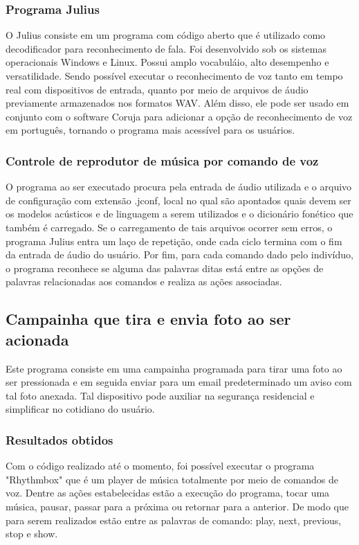 \subsubsection{Programa Julius}

O Julius consiste em um programa com código aberto que é utilizado como decodificador para reconhecimento de fala. 
Foi desenvolvido sob os sistemas operacionais Windows e Linux. Possui amplo vocabuláio, alto desempenho e versatilidade. 
Sendo possível executar o reconhecimento de voz tanto em tempo real com dispositivos de entrada, quanto por meio de arquivos de áudio previamente armazenados nos formatos WAV.
Além disso, ele pode ser usado em conjunto com o software Coruja para adicionar a opção de reconhecimento de voz em português, tornando o programa mais acessível para os usuários.


\subsubsection{Controle de reprodutor de música por comando de voz}

O programa ao ser executado procura pela entrada de áudio utilizada e o arquivo de configuração com extensão .jconf, local no qual são apontados quais devem ser os modelos acústicos e de linguagem a serem utilizados e o dicionário fonético que também é carregado. 
Se o carregamento de tais arquivos ocorrer sem erros, o programa Julius entra um laço de repetição, onde cada ciclo termina com o fim da entrada de áudio do usuário. Por fim, para cada comando dado pelo indivíduo, o programa reconhece se alguma das palavras ditas está entre as opções de palavras relacionadas aos comandos e realiza as ações associadas.

\subsection{Campainha que tira e envia foto ao ser acionada}

Este programa consiste em uma campainha programada para tirar uma foto ao ser pressionada e em seguida enviar para um email predeterminado um aviso com tal foto anexada. Tal dispositivo pode auxiliar na segurança residencial e simplificar no cotidiano do usuário.  
  

\subsubsection{Resultados obtidos}

Com o código realizado até o momento, foi possível executar o programa "Rhythmbox" que é um player de música totalmente por meio de comandos de voz. 
Dentre as ações estabelecidas estão a execução do programa, tocar uma música, pausar, passar para a próxima ou retornar para a anterior.
De modo que para serem realizados estão entre as palavras de comando: play, next, previous, stop e show.



